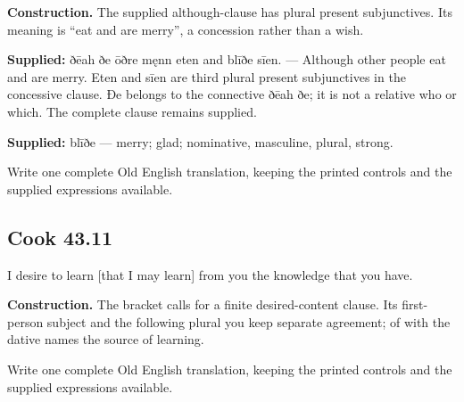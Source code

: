 \textbf{Construction.} The supplied although-clause has plural present subjunctives. Its meaning is “eat and are merry”, a concession rather than a wish.

\textbf{Supplied:} ðēah ðe ōðre męnn eten and blīðe sīen. — Although other people eat and are merry. Eten and sīen are third plural present subjunctives in the concessive clause. Ðe belongs to the connective ðēah ðe; it is not a relative who or which. The complete clause remains supplied.

\textbf{Supplied:} blīðe — merry; glad; nominative, masculine, plural, strong.

Write one complete Old English translation, keeping the printed controls and the supplied expressions available.

\par\begin{minipage}{\linewidth}\raggedright
\subsection*{Cook 43.11}

I desire to learn [that I may learn] from you the knowledge that you have.

\textbf{Construction.} The bracket calls for a finite desired-content clause. Its first-person subject and the following plural you keep separate agreement; of with the dative names the source of learning.

Write one complete Old English translation, keeping the printed controls and the supplied expressions available.

\end{minipage}\par\addvspace{4pt}

